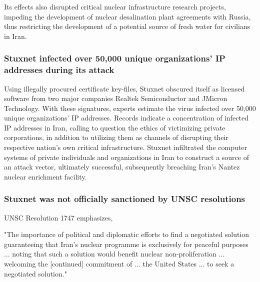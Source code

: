 \documentclass[12pt]{article}
\begin{document}
\begin{multicols}{2}
Its effects also disrupted critical nuclear infrastructure research projects, impeding the development of nuclear desalination plant agreements with Russia, thus restricting the development of a potential source of fresh water for civilians in Iran.\cite{iranRussiaNuclearCooperation}



\subsubsection{Stuxnet infected over 50,000 unique organizations' IP addresses during its attack}

Using illegally procured certificate key-files, Stuxnet obscured itself as licensed software from two major companies Realtek Semiconductor and JMicron Technology. With these signatures, experts estimate the virus infected over 50,000 unique organizations' IP addresses.\cite{lessonsFromStuxnet} Records indicate a concentration of infected IP addresses in Iran, calling to question the ethics of victimizing private corporations, in addition to  utilizing them as channels of disrupting their respective nation's own critical infrastructure. Stuxnet infiltrated the computer systems of private individuals and organizations in Iran to construct a source of an attack vector, ultimately successful, subsequently breaching Iran's Nantez nuclear enrichment facility.\cite{w32.stuxnetDossier} 

\subsubsection{Stuxnet was not officially sanctioned by UNSC resolutions}

UNSC Resolution 1747 emphasizes,
\begin{displayquote}
"The importance of political and diplomatic efforts to find a negotiated solution guaranteeing that Iran’s nuclear programme is exclusively for peaceful purposes ... noting that such a solution would benefit nuclear non-proliferation ... welcoming the [continued] commitment of ... the United States ... to seek a negotiated solution."\cite{resolution1747}
\end{displayquote}


\end{multicols}
\end{document}
